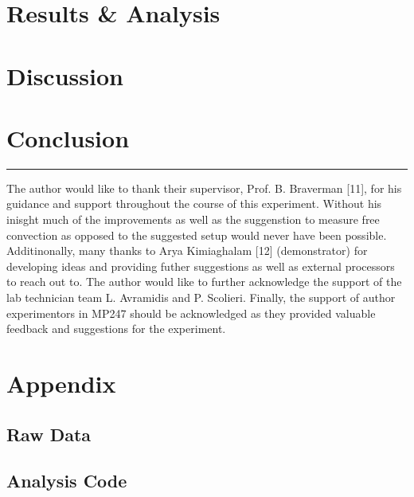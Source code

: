 \documentclass[aip, cp, amsmath, amssymb, reprint, nofootinbib]{revtex4-2}
\begin{document}
    \section{Results \& Analysis}
        
    
    \section{Discussion}
    
    
    \section{Conclusion}



\onecolumngrid
\begin{center}
    \vspace{0.8cm}
    \noindent\rule{0.9\textwidth}{0.5pt}
\end{center}

\begin{acknowledgments}
    The author would like to thank their supervisor, Prof. B. Braverman [11], for his guidance and support throughout the course of this experiment. Without his inisght much of the improvements as well as the suggenstion to measure free convection as opposed to the suggested setup would never have been possible. Additinonally, many thanks to Arya Kimiaghalam [12] (demonstrator) for developing ideas and providing futher suggestions as well as external processors to reach out to. The author would like to further acknowledge the support of the lab technician team L. Avramidis and P. Scolieri. Finally, the support of author experimentors in MP247 should be acknowledged as they provided valuable feedback and suggestions for the experiment.
\end{acknowledgments}



\appendix
\section{Appendix}
\subsection{Raw Data}

\subsection{Analysis Code}
\end{document}
